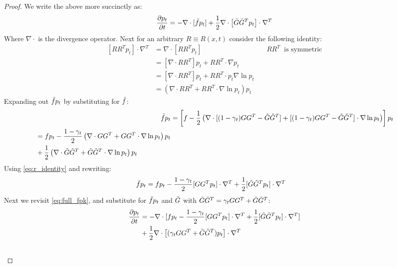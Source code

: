 \begin{proof}
We write the above more succinctly as:
\begin{align}
\label{eq:full_fpk}
\frac{\partial p_t}{\partial t} = -\nabla \cdot [\bar f p_t] + \frac{1}{2}\nabla \cdot\left[\bar G\bar G^Tp_t \right] \cdot \nabla^T
\end{align}
Where $\nabla \cdot$ is the divergence operator.
Next for an arbitrary $R \equiv R(x, t)$ consider the following identity:
\begin{align}
\left[RR^Tp_t \right] \cdot \nabla^T &= \nabla\cdot \left[RR^Tp_t \right] & \quad RR^T~\text{ is symmetric}\\
&= \left[\nabla\cdot RR^T \right]p_t  + RR^T \cdot \nabla p_t \\
&= \left[\nabla\cdot RR^T \right]p_t  + RR^T \cdot p_t \nabla\ln  p_t \\
\label{eq:r_identity}
&= \left(\nabla\cdot RR^T  + RR^T \cdot \nabla \ln p_t \right)p_t
\end{align}
Expanding out $\bar f p_t$ by substituting for $\bar f$:
\begin{align}
\bar f p_t &= \left[f - \frac{1}{2}\left(\nabla \cdot [(1-\gamma_t)GG^T-\tilde G\tilde G^T] + [(1-\gamma_t)GG^T-\tilde G\tilde G^T]\cdot\nabla\ln p_t \right)\right] p_t \\
\begin{split}
&= fp_t - \frac{1-\gamma_t}{2}\left(\nabla \cdot GG^T + GG^T\cdot\nabla\ln p_t \right) p_t \\
&+ \frac{1}{2}\left(\nabla \cdot \tilde G\tilde G^T + \tilde G\tilde G^T\cdot\nabla\ln p_t \right) p_t
\end{split}
\end{align}
Using \cref{eq:r_identity} and rewriting:
\begin{align}
\begin{split}
\bar f p_t &= fp_t - \frac{1-\gamma_t}{2}[GG^Tp_t] \cdot \nabla^T + \frac{1}{2}[\tilde G\tilde G^Tp_t] \cdot \nabla^T
\end{split}
\end{align}
Next we revisit \cref{eq:full_fpk}, and substitute for $\bar f p_t$ and $\bar G$ with $\bar G\bar G^T = \gamma_t GG^T + \tilde G\tilde G^T$:
\begin{align}
\begin{split}
\frac{\partial p_t}{\partial t} &= -\nabla \cdot [fp_t - \frac{1-\gamma_t}{2}[GG^Tp_t] \cdot \nabla^T + \frac{1}{2}[\GT\GT^Tp_t] \cdot \nabla^T ] \\
&+ \frac{1}{2}\nabla \cdot\left[(\gamma_t GG^T + \GT\GT^T)p_t \right] \cdot \nabla^T
\end{split} \\
\begin{split}

\end{split}
\end{align}
\end{proof}
